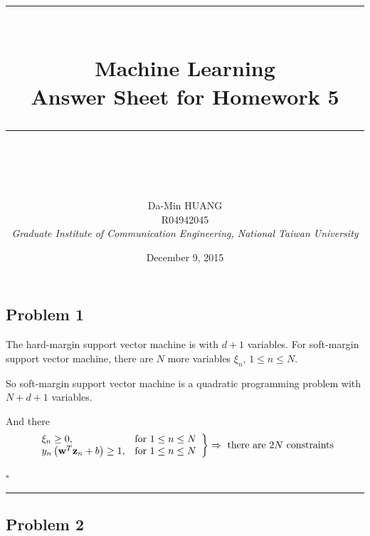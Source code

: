 \documentclass[12pt]{article}
\newcommand*{\QEDB}{\hfill\ensuremath{\square}}
\newcommand{\ParTh}[1]{\left(#1\right)}
\newcommand{\BF}[1]{{\bf#1}}
\newcommand{\horrule}[1]{\rule{\linewidth}{#1}}
\begin{document}
\baselineskip 6.5mm
\setlength{\parindent}{0pt}
\title{ 
\normalfont \normalsize 
\horrule{0.5pt} \\[0.4cm]
\huge { \Huge Machine Learning \\ \large Answer Sheet for Homework 5 }\\ %
\horrule{2pt} \\ [0.5cm]
}
\author{ { \Large Da-Min HUANG } \\
{\small R04942045} \\
{\small\textit{Graduate Institute of Communication Engineering, National Taiwan University}}
}
\date{December 9, 2015}
\maketitle

\subsection*{Problem 1}

The hard-margin support vector machine is with $d+1$ variables. For soft-margin support vector machine, there are $N$ more variables $\xi_n$, $1\leq n\leq N$.

So soft-margin support vector machine is a quadratic programming problem with $N+d+1$ variables.

And there
\begin{align}
\left.
\begin{array}{ll}
\xi_n\geq0,&\text{for }1\leq n\leq N\\
y_n\ParTh{\BF{w}^T\BF{z}_n+b}\geq1,&\text{for }1\leq n\leq N
\end{array}
\right\}\Rightarrow\text{ there are }2N\text{ constraints}
\end{align}

\QEDB

\horrule{0.5pt}

\subsection*{Problem 2}
\end{document}
